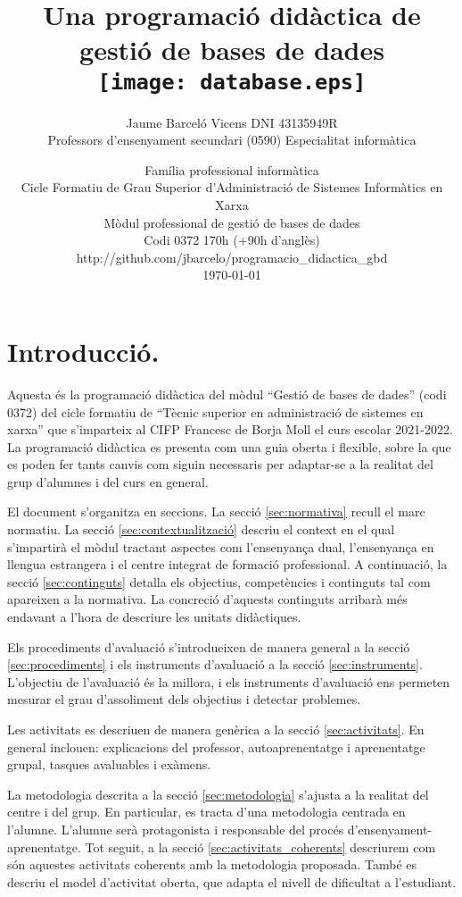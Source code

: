 \documentclass[catalan, a4paper, 12pt, titlepage]{article}
\title{Una programació didàctica de \\
gestió de bases de dades\\
	\texttt{[image: database.eps]}
	}
\author{
	Jaume Barceló Vicens
	DNI 43135949R\\
	Professors d'ensenyament secundari (0590)
	Especialitat informàtica}
\date{
	Família professional informàtica \\
	Cicle Formatiu de Grau Superior d’Administració de Sistemes Informàtics en Xarxa\\
	Mòdul professional de gestió de bases de dades\\
	Codi 0372 170h (+90h d'anglès)\\
	http://github.com/jbarcelo/programacio\_didactica\_gbd \\
	\faCalendar*[regular] \today%
	}
\begin{document}
\pagestyle{empty}

\maketitle

\tableofcontents 

\pagestyle{fancy}

\section{Introducció.}

Aquesta és la programació didàctica del mòdul ``Gestió de bases de dades'' (codi 0372) del cicle formatiu de ``Tècnic superior en administració de sistemes en xarxa'' que s'imparteix al CIFP Francesc de Borja Moll el curs escolar 2021-2022.
La programació didàctica es presenta com una guia oberta i flexible, sobre la que es poden fer tants canvis com siguin necessaris per adaptar-se a la realitat del grup d'alumnes i del curs en general.

El document s'organitza en seccions. 
La secció \ref{sec:normativa} recull el marc normatiu.
La secció \ref{sec:contextualització} descriu el context en el qual s'impartirà el mòdul tractant aspectes com l'ensenyança dual, l'ensenyança en llengua estrangera i el centre integrat de formació professional.
A continuació, la secció \ref{sec:continguts} detalla els objectius, competències i continguts tal com apareixen a la normativa.
La concreció d'aquests continguts arribarà més endavant a l'hora de descriure les unitats didàctiques.

Els procediments d'avaluació s'introdueixen de manera general a la secció \ref{sec:procediments} i els instruments d'avaluació a la secció \ref{sec:instruments}.
L'objectiu de l'avaluació és la millora, i els instruments d'avaluació ens permeten mesurar el grau d'assoliment dels objectius i detectar problemes.

Les activitats es descriuen de manera genèrica a la secció \ref{sec:activitats}.
En general inclouen: explicacions del professor, autoaprenentatge i aprenentatge grupal, tasques avaluables i exàmens.

La metodologia descrita a la secció \ref{sec:metodologia} s'ajusta a la realitat del centre i del grup.
En particular, es tracta d'una metodologia centrada en l'alumne.
L'alumne serà protagonista i responsable del procés d'ensenyament-aprenentatge.
Tot seguit, a la secció \ref{sec:activitats_coherents} descriurem com són aquestes activitats coherents amb la metodologia proposada.
També es descriu el model d'activitat oberta, que adapta el nivell de dificultat a l'estudiant.
\end{document}
